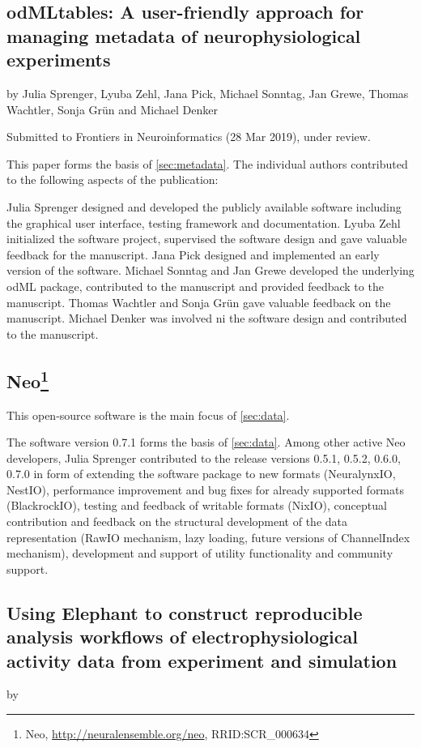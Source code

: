 \subsection*{odMLtables: A user-friendly approach for managing metadata of neurophysiological experiments}
by Julia Sprenger, Lyuba Zehl, Jana Pick, Michael Sonntag, Jan Grewe, Thomas Wachtler, Sonja Grün and Michael Denker

Submitted to Frontiers in Neuroinformatics (28 Mar 2019), under review.

This paper forms the basis of \ref{sec:metadata}. The individual authors contributed to the following aspects of the publication:

Julia Sprenger designed and developed the publicly available software including the graphical user interface, testing framework and documentation. Lyuba Zehl initialized the software project, supervised the software design and gave valuable feedback for the manuscript. Jana Pick designed and implemented an early version of the software. Michael Sonntag and Jan Grewe developed the underlying odML package, contributed to the manuscript and provided feedback to the manuscript. Thomas Wachtler and Sonja Grün gave valuable feedback on the manuscript. Michael Denker was involved ni the software design and contributed to the manuscript.

\subsection*{Neo\footnote{Neo, \url{http://neuralensemble.org/neo}, RRID:SCR\_000634} \cite{neo09}}
This open-source software is the main focus of \ref{sec:data}. 

The software version 0.7.1 forms the basis of \ref{sec:data}. Among other active Neo developers, Julia Sprenger contributed to the release versions 0.5.1, 0.5.2, 0.6.0, 0.7.0 in form of extending the software package to new formats (NeuralynxIO, NestIO), performance improvement and bug fixes for already supported formats (BlackrockIO), testing and feedback of writable formats (NixIO), conceptual contribution and feedback on the structural development of the data representation (RawIO mechanism, lazy loading, future versions of ChannelIndex mechanism), development and support of utility functionality and community support.

\subsection*{Using Elephant to construct reproducible analysis workflows of electrophysiological activity data from experiment and simulation}
by 

